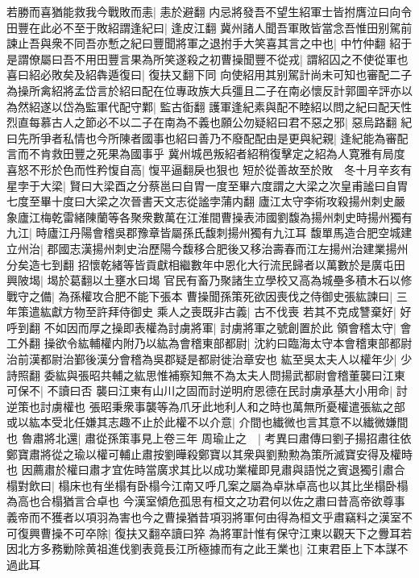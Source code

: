若勝而喜猶能救我今戰敗而恚|{
	恚於避翻}
内忌將發吾不望生紹軍士皆拊膺泣曰向令田豐在此必不至于敗紹謂逢紀曰|{
	逢皮江翻}
冀州諸人聞吾軍敗皆當念吾惟田别駕前諫止吾與衆不同吾亦慙之紀曰豐聞將軍之退拊手大笑喜其言之中也|{
	中竹仲翻}
紹于是謂僚屬曰吾不用田豐言果為所笑遂殺之初曹操聞豐不從戎|{
	謂紹囚之不使從軍也}
喜曰紹必敗矣及紹犇遁復曰|{
	復扶又翻下同}
向使紹用其别駕計尚未可知也審配二子為操所禽紹將孟岱言於紹曰配在位專政族大兵彊且二子在南必懷反計郭圖辛評亦以為然紹遂以岱為監軍代配守鄴|{
	監古衘翻}
護軍逢紀素與配不睦紹以問之紀曰配天性烈直每慕古人之節必不以二子在南為不義也願公勿疑紹曰君不惡之邪|{
	惡烏路翻}
紀曰先所爭者私情也今所陳者國事也紹曰善乃不廢配配由是更與紀親|{
	逢紀能為審配言而不肯救田豐之死果為國事乎}
冀州城邑叛紹者紹稍復擊定之紹為人寛雅有局度喜怒不形於色而性矜愎自高|{
	愎平逼翻戾也狠也}
短於從善故至於敗　冬十月辛亥有星孛于大梁|{
	賢曰大梁酉之分蔡邕曰自胃一度至畢六度謂之大梁之次皇甫謐曰自胃七度至畢十度曰大梁之次晉書天文志從謐孛蒲内翻}
廬江太守李術攻殺揚州刺史嚴象廬江梅乾雷緒陳蘭等各聚衆數萬在江淮間曹操表沛國劉馥為揚州刺史時揚州獨有九江|{
	時廬江丹陽會稽吳郡豫章皆屬孫氏馥刺揚州獨有九江耳}
馥單馬造合肥空城建立州治|{
	郡國志漢揚州刺史治歷陽今馥移合肥後又移治壽春而江左揚州治建業揚州分矣造七到翻}
招懷乾緒等皆貢獻相繼數年中恩化大行流民歸者以萬數於是廣屯田興陂堨|{
	堨於葛翻以土壅水曰堨}
官民有畜乃聚諸生立學校又高為城壘多積木石以修戰守之備|{
	為孫權攻合肥不能下張本}
曹操聞孫策死欲因喪伐之侍御史張紘諫曰|{
	三年策遣紘獻方物至許拜侍御史}
乘人之喪既非古義|{
	古不伐喪}
若其不克成讐棄好|{
	好呼到翻}
不如因而厚之操即表權為討虜將軍|{
	討虜將軍之號創置於此}
領會稽太守|{
	會工外翻}
操欲令紘輔權内附乃以紘為會稽東部都尉|{
	沈約曰臨海太守本會稽東部都尉治前漢都尉治鄞後漢分會稽為吳郡疑是都尉徙治章安也}
紘至吳太夫人以權年少|{
	少詩照翻}
委紘與張昭共輔之紘思惟補察知無不為太夫人問揚武都尉會稽董襲曰江東可保不|{
	不讀曰否}
襲曰江東有山川之固而討逆明府恩德在民討虜承基大小用命|{
	討逆策也討虜權也}
張昭秉衆事襲等為爪牙此地利人和之時也萬無所憂權遣張紘之部或以紘本受北任嫌其志趣不止於此權不以介意|{
	介間也纎微也言其意不以纎微嫌間也}
魯肅將北還|{
	肅從孫策事見上卷三年}
周瑜止之　|{
	考異曰肅傳曰劉子揚招肅往依鄭寶肅將從之瑜以權可輔止肅按劉曄殺鄭寶以其衆與劉勲勲為策所滅寶安得及權時也}
因薦肅於權曰肅才宜佐時當廣求其比以成功業權即見肅與語悦之賓退獨引肅合榻對飲曰|{
	榻床也有坐榻有卧榻今江南又呼几案之屬為卓牀卓高也以其比坐榻卧榻為高也合榻猶言合卓也}
今漢室傾危孤思有桓文之功君何以佐之肅曰昔高帝欲尊事義帝而不獲者以項羽為害也今之曹操猶昔項羽將軍何由得為桓文乎肅竊料之漢室不可復興曹操不可卒除|{
	復扶又翻卒讀曰猝}
為將軍計惟有保守江東以觀天下之釁耳若因北方多務勦除黄祖進伐劉表竟長江所極據而有之此王業也|{
	江東君臣上下本謀不過此耳}
